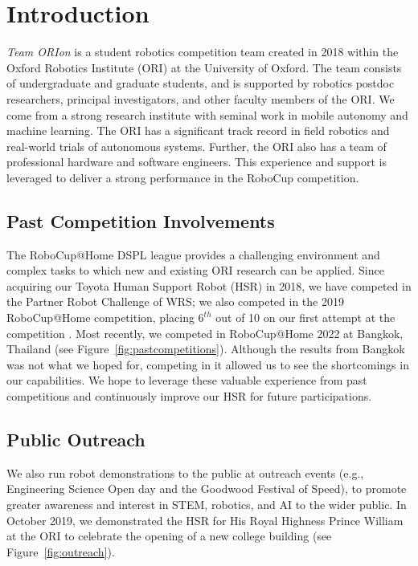\documentclass[runningheads,a4paper]{llncs}
\newcommand{\teamori}{Team ORIon}
\begin{document}
\section{Introduction}

\textit{\teamori{}} is a student robotics competition team created in 2018 within the Oxford Robotics Institute (ORI) at the University of Oxford. 
The team consists of undergraduate and graduate students, and is supported by robotics postdoc researchers, principal investigators, and other faculty members of the ORI. 
We come from a strong research institute with seminal work in mobile autonomy and machine learning. The ORI has a significant track record in field robotics and real-world trials of autonomous systems.
Further, the ORI also has a team of professional hardware and software engineers. This experience and support is leveraged to deliver a strong performance in the RoboCup competition.

\subsection{Past Competition Involvements}
The RoboCup@Home DSPL league provides a challenging environment and complex tasks to which new and existing ORI research can be applied.
Since acquiring our Toyota Human Support Robot (HSR) in 2018, we have competed in the Partner Robot Challenge of WRS; we also competed in the 2019 RoboCup@Home competition, placing $6^{th}$ out of 10 on our first attempt at the competition . Most recently, we competed in RoboCup@Home 2022 at Bangkok, Thailand (see Figure~\ref{fig:pastcompetitions}).
Although the results from Bangkok was not what we hoped for, competing in it allowed us to see the shortcomings in our capabilities. We hope to leverage these valuable experience from past competitions and continuously improve our HSR for future participations. 

\subsection{Public Outreach}
We also run robot demonstrations to the public at outreach events (e.g., Engineering Science Open day and the Goodwood Festival of Speed), to promote greater awareness and interest in STEM, robotics, and AI to the wider public. In October 2019, we demonstrated the HSR for His Royal Highness Prince William at the ORI to celebrate the opening of a new college building (see Figure~\ref{fig:outreach}).
\end{document}

